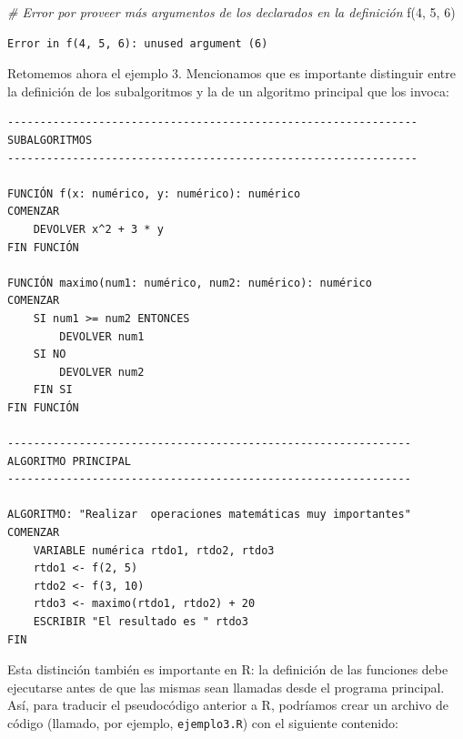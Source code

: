 \documentclass[
]{book}
\newenvironment{Shaded}{\begin{snugshade}}{\end{snugshade}}
\newcommand{\CommentTok}[1]{\textcolor[rgb]{0.56,0.35,0.01}{\textit{#1}}}
\newcommand{\DecValTok}[1]{\textcolor[rgb]{0.00,0.00,0.81}{#1}}
\newcommand{\FunctionTok}[1]{\textcolor[rgb]{0.00,0.00,0.00}{#1}}
\newcommand{\NormalTok}[1]{#1}
\begin{document}
\begin{Shaded}
\begin{Highlighting}[]
\CommentTok{\# Error por proveer más argumentos de los declarados en la definición}
\FunctionTok{f}\NormalTok{(}\DecValTok{4}\NormalTok{, }\DecValTok{5}\NormalTok{, }\DecValTok{6}\NormalTok{)}
\end{Highlighting}
\end{Shaded}

\begin{verbatim}
Error in f(4, 5, 6): unused argument (6)
\end{verbatim}

Retomemos ahora el ejemplo 3. Mencionamos que es importante distinguir entre la definición de los subalgoritmos y la de un algoritmo principal que los invoca:

\begin{verbatim}
---------------------------------------------------------------
SUBALGORITMOS
---------------------------------------------------------------

FUNCIÓN f(x: numérico, y: numérico): numérico
COMENZAR
    DEVOLVER x^2 + 3 * y
FIN FUNCIÓN

FUNCIÓN maximo(num1: numérico, num2: numérico): numérico
COMENZAR
    SI num1 >= num2 ENTONCES
        DEVOLVER num1
    SI NO
        DEVOLVER num2
    FIN SI
FIN FUNCIÓN

--------------------------------------------------------------
ALGORITMO PRINCIPAL
--------------------------------------------------------------

ALGORITMO: "Realizar  operaciones matemáticas muy importantes"
COMENZAR
    VARIABLE numérica rtdo1, rtdo2, rtdo3
    rtdo1 <- f(2, 5)
    rtdo2 <- f(3, 10)
    rtdo3 <- maximo(rtdo1, rtdo2) + 20
    ESCRIBIR "El resultado es " rtdo3
FIN
\end{verbatim}

Esta distinción también es importante en R: la definición de las funciones debe ejecutarse antes de que las mismas sean llamadas desde el programa principal. Así, para traducir el pseudocódigo anterior a R, podríamos crear un archivo de código (llamado, por ejemplo, \texttt{ejemplo3.R}) con el siguiente contenido:
\end{document}
